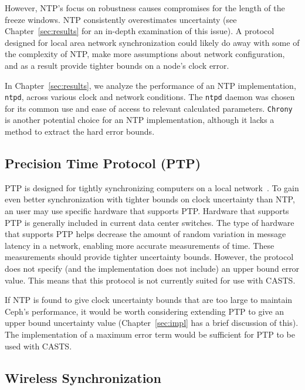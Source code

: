However, NTP's focus on robustness
causes compromises for the length of the freeze windows. NTP consistently overestimates
uncertainty (see Chapter~\ref{sec:results} for an in-depth examination
of this issue). A protocol designed for local area network
synchronization could likely do away with some of the complexity of
NTP, make more assumptions about network configuration, and as a
result provide tighter bounds on a node's clock error.

In Chapter~\ref{sec:results}, we analyze the performance of an NTP
implementation, \texttt{ntpd}, across various clock and network
conditions. The \texttt{ntpd} daemon was chosen for its common use and
ease of access to relevant calculated parameters. \texttt{Chrony} is
another potential choice for an NTP implementation, although it lacks
a method to extract the hard error bounds.

\subsection{Precision Time Protocol (PTP)}

PTP is designed for tightly synchronizing
computers on a local network~\citep{2008}. To gain even better
synchronization with tighter bounds on clock uncertainty than NTP, an 
user may use specific hardware that supports PTP. Hardware that
supports PTP is generally included in current data center switches. 
The type of hardware that supports PTP helps decrease the
amount of random variation in message latency in a network, enabling
more accurate measurements of time.  These measurements should 
provide tighter uncertainty bounds. However, the
protocol does not specify (and the implementation does not include) an
upper bound error value. This means that this protocol is not
currently suited for use with CASTS.

If NTP is found to give clock uncertainty bounds that are too large to 
maintain Ceph's performance, it would be worth considering extending PTP to
give an upper bound uncertainty value (Chapter~\ref{sec:impl} has a
brief discussion of this). The implementation of a maximum error term
would be sufficient for PTP to be used with CASTS.


\subsection{Wireless Synchronization}

